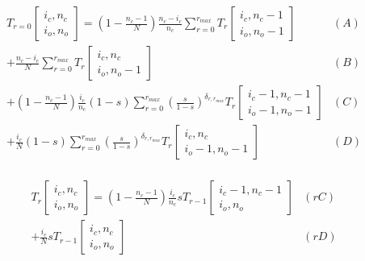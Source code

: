 \documentclass[preview]{standalone}
\newcommand{\Coalc}[4]{\begin{bmatrix}#1,#2 \\ #3,#4 \end{bmatrix}}
\begin{document}
\begin{equation*}
  \begin{aligned}
    T_{r=0}\Coalc{i_c}{n_c}{i_o}{n_o}
    = \left(1-\frac{n_c-1}{N}\right) \frac{n_c-i_c}{n_c}       \sum_{r=0}^{r_{max}}                                                 T_{r}\Coalc{i_c  }{n_c-1}{i_o  }{n_o-1} & (A) \\
    +                                \frac{n_c-i_c}{N}         \sum_{r=0}^{r_{max}}                                                 T_{r}\Coalc{i_c  }{n_c  }{i_o  }{n_o-1} & (B) \\
    + \left(1-\frac{n_c-1}{N}\right) \frac{i_c}{n_c}     (1-s) \sum_{r=0}^{r_{max}} \left(\frac{s}{1-s}\right)^{\delta_{r,r_{max}}} T_{r}\Coalc{i_c-1}{n_c-1}{i_o-1}{n_o-1} & (C) \\
    +                                \frac{i_c}{N}       (1-s) \sum_{r=0}^{r_{max}} \left(\frac{s}{1-s}\right)^{\delta_{r,r_{max}}} T_{r}\Coalc{i_c  }{n_c  }{i_o-1}{n_o-1} & (D) \\
  \end{aligned}
\end{equation*}

\begin{equation*}
  \begin{aligned}
    T_{r}\Coalc{i_c}{n_c}{i_o}{n_o}
    = \left(1-\frac{n_c-1}{N}\right) \frac{i_c}{n_c} s T_{r-1} \Coalc{i_c-1}{n_c-1}{i_o}{n_o}& (rC) \\
    +                                \frac{i_c}{N}   s T_{r-1} \Coalc{i_c  }{n_c  }{i_o}{n_o}& (rD) \\
  \end{aligned}
\end{equation*}
\end{document}

